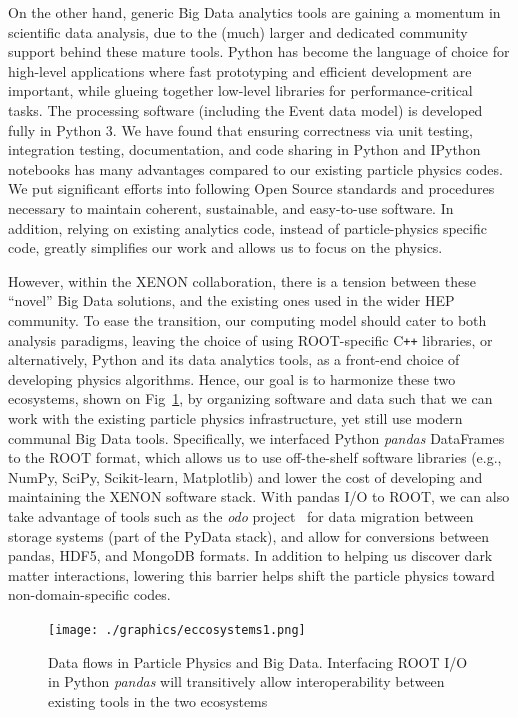 \documentclass[a4paper]{jpconf}
\begin{document}
On the other hand, generic Big Data analytics tools are gaining a momentum in scientific data analysis, due to the (much) larger and dedicated community support behind these mature tools.
Python has become the language of choice for high-level applications where fast 
prototyping and efficient development are important, while glueing together 
low-level libraries for performance-critical tasks.
The processing software (including the Event data model) is developed fully in Python 3. 
We have found that ensuring correctness via unit testing, integration testing, documentation, and code
sharing in Python and IPython notebooks has many advantages compared to our existing particle
physics codes. We put significant efforts into following Open Source standards and procedures necessary to maintain 
coherent, sustainable, and easy-to-use software. In addition, relying on existing analytics code, instead of particle-physics specific code, greatly
simplifies our work and allows us to focus on the physics.

However, within the XENON collaboration, there is a tension between these ``novel'' Big Data solutions, and the existing ones used in the wider HEP community.
To ease the transition, our computing model should cater to both analysis paradigms, leaving the choice of using ROOT-specific C\texttt{++} libraries, or alternatively, 
Python and its data analytics tools, as a 
front-end choice of developing physics algorithms. 
Hence, our goal is to harmonize these two ecosystems, shown on Fig~\ref{fig:two_eccosystems}, by organizing software and data
such that we can work with the existing particle physics infrastructure, yet still use modern communal Big Data tools.
Specifically, we interfaced Python \textit{pandas} DataFrames to the ROOT format, which allows us to use 
off-the-shelf software libraries (e.g., NumPy, SciPy, Scikit-learn, Matplotlib) and lower the cost of developing and maintaining the XENON software stack. 
With pandas I/O to ROOT, we
can also take advantage of tools such as the \textit{odo} project~\cite{odo-pydata} for data migration between storage systems (part of the PyData stack), and allow for conversions between
pandas, HDF5, and MongoDB formats. 
In addition to helping us discover dark matter interactions, lowering this barrier helps shift the particle physics
toward non-domain-specific codes.

\begin{figure}[!t]
\centering
\begin{center}
\texttt{[image: ./graphics/eccosystems1.png]}
\caption{Data flows in Particle Physics and Big Data. Interfacing ROOT I/O in Python \textit{pandas} will transitively allow interoperability between existing tools in the two ecosystems}
\label{fig:two_eccosystems}
\end{center}
\end{figure}
\end{document}
